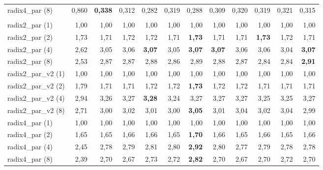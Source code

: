\begin{table}[H]
\begin{tabular}{lrrrrrrrrrrr}
radix4\_par (8) & 0,860 & \textbf{0,338} & 0,312 & 0,282 & 0,319 & 0,288 & 0,309 & 0,320 & 0,319 & 0,321 & 0,315 \\
\addlinespace
\multicolumn{12}{l}{\textit{Stosunek czasu procesora do czasu ściany $R$}} \\[2pt]
radix2\_par (1) & 1,00 & 1,00 & 1,00 & 1,00 & 1,00 & 1,00 & 1,00 & 1,00 & 1,00 & 1,00 & 1,00 \\
radix2\_par (2) & 1,73 & 1,71 & 1,72 & 1,72 & 1,71 & \textbf{1,73} & 1,71 & 1,71 & \textbf{1,73} & 1,72 & 1,71 \\
radix2\_par (4) & 2,62 & 3,05 & 3,06 & \textbf{3,07} & 3,05 & \textbf{3,07} & \textbf{3,07} & 3,06 & 3,06 & 3,04 & \textbf{3,07} \\
radix2\_par (8) & 2,53 & 2,87 & 2,87 & 2,88 & 2,86 & 2,89 & 2,88 & 2,87 & 2,84 & 2,84 & \textbf{2,91} \\
\addlinespace
radix2\_par\_v2 (1) & 1,00 & 1,00 & 1,00 & 1,00 & 1,00 & 1,00 & 1,00 & 1,00 & 1,00 & 1,00 & 1,00 \\
radix2\_par\_v2 (2) & 1,79 & 1,71 & 1,71 & 1,72 & 1,72 & \textbf{1,73} & 1,72 & 1,72 & 1,71 & 1,71 & 1,71 \\
radix2\_par\_v2 (4) & 2,94 & 3,26 & 3,27 & \textbf{3,28} & 3,24 & 3,27 & 3,27 & 3,27 & 3,25 & 3,25 & 3,27 \\
radix2\_par\_v2 (8) & 2,71 & 3,00 & 3,02 & 3,01 & 3,00 & \textbf{3,05} & 3,01 & 3,04 & 3,02 & 3,04 & 2,99 \\
\addlinespace
radix4\_par (1) & 1,00 & 1,00 & 1,00 & 1,00 & 1,00 & 1,00 & 1,00 & 1,00 & 1,00 & 1,00 & 1,00 \\
radix4\_par (2) & 1,65 & 1,65 & 1,66 & 1,66 & 1,65 & \textbf{1,70} & 1,66 & 1,65 & 1,66 & 1,65 & 1,66 \\
radix4\_par (4) & 2,45 & 2,78 & 2,79 & 2,81 & 2,80 & \textbf{2,92} & 2,80 & 2,77 & 2,79 & 2,78 & 2,78 \\
radix4\_par (8) & 2,39 & 2,70 & 2,67 & 2,73 & 2,72 & \textbf{2,82} & 2,70 & 2,67 & 2,70 & 2,72 & 2,70 \\
\bottomrule
\end{tabular}
\end{table}

